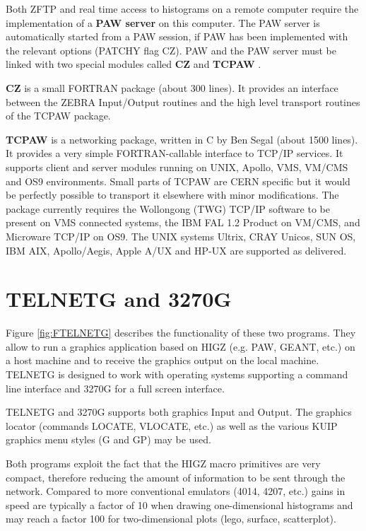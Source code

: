 Both ZFTP and real time access to histograms on a remote
computer require the implementation of a  {\bf PAW server}
on this computer. The PAW server is automatically started
from a PAW session, if PAW has been implemented with
the relevant options (PATCHY \cite{bib-PATCHY} flag CZ).
PAW and the PAW server must be linked with two special modules
called {\bf CZ} and {\bf TCPAW} \cite{bib-TCPAW1,bib-TCPAW2}.
 
{\bf CZ} is a small FORTRAN package (about 300 lines). It provides
an interface between the ZEBRA Input/Output routines
and the high level transport routines of the TCPAW package.
 
{\bf TCPAW}\cite{bib-TCPAW1}
is a networking package, written in C by Ben Segal (about 1500 lines).
It provides a very simple FORTRAN-callable interface to TCP/IP services.
It supports client and server modules running on UNIX, Apollo, VMS,
VM/CMS and OS9 environments. Small parts of TCPAW
are CERN specific but it would be perfectly possible
to transport it elsewhere with minor modifications. The package
currently requires the Wollongong (TWG) TCP/IP software
to be present on VMS connected systems, the IBM FAL 1.2 Product
on VM/CMS, and Microware TCP/IP on OS9. The UNIX systems
Ultrix, CRAY Unicos, SUN OS, IBM AIX, Apollo/Aegis, Apple A/UX and HP-UX
are supported as delivered.

\section{TELNETG and 3270G}
 
Figure \ref{fig:FTELNETG}
describes the functionality of these two programs.
They allow
to run a graphics application based on HIGZ (e.g. PAW, GEANT, etc.) on a host
machine and to receive the graphics output on the local machine. TELNETG is
designed to work with operating systems supporting a command line interface
and 3270G for a full screen interface.
 
TELNETG and 3270G supports both graphics Input and Output. The graphics
locator (commands LOCATE, VLOCATE, etc.) as well as the various KUIP graphics menu
styles (G and GP) may be used.
 
Both programs exploit the fact that the HIGZ macro primitives are very
compact, therefore reducing the amount of information to be sent through
the network. Compared to more conventional emulators (4014, 4207, etc.)
gains in speed are typically a factor of 10 when drawing one-dimensional histograms
and may reach a factor 100 for two-dimensional plots (lego, surface, scatterplot).
 
